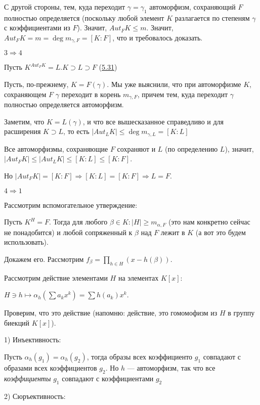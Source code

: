 \documentclass[../main.tex]{subfiles}
\begin{document}
    С другой стороны, тем, куда переходит $\gamma = \gamma_1$ автоморфизм,
    сохраняющий $F$ полностью определяется (поскольку любой элемент $K$
    разлагается по степеням $\gamma$ с коэффициентами из $F$). Значит,
    $Aut_FK \leqslant m$. Значит, $Aut_FK = m = \deg m_{\gamma, F} = [K : F]$,
    что и требовалось доказать.

    $3 \Rightarrow 4$

    Пусть $K^{Aut_FK} = L. K \supset L \supset F$ (\hyperlink{5.31}{5.31})

    Пусть, по-прежнему, $K = F(\gamma)$. Мы уже выяснили, что при автоморфизме
    $K$, сохраняющем $F$ $\gamma$ переходит в корень $m_{\gamma, F}$, причем
    тем, куда переходит $\gamma$ полностью определяется автоморфизм.

    Заметим, что $K = L(\gamma)$, и что все вышесказанное справедливо и для
    расширения $K \supset L$, то есть $|Aut_LK| \leqslant \deg m_{\gamma, L}
    = [K : L]$

    Все автоморфизмы, сохраняющие $F$ сохраняют и $L$ (по определению $L$),
    значит, $|Aut_FK| \leqslant |Aut_LK| \leqslant [K : L] \leqslant [K : F]$.

    Но $|Aut_FK| = [K : F] \Rightarrow [K : L] = [K : F] \Rightarrow L = F$.

    $4 \Rightarrow 1$

    Рассмотрим вспомогательное утверждение:

    Пусть $K^H = F$. Тогда для любого $\beta \in K: |H| \geqslant
    m_{\alpha, F}$ (это нам конкретно сейчас не понадобится)
    и любой сопряженный к $\beta$ над $F$ лежит в $K$
    (а вот это будем использовать).

    Докажем его. Рассмотрим $f_\beta
    = {\displaystyle \prod_{h \in H}(x - h(\beta))}$.

    Рассмотрим действие элементами $H$ на элементах
    $K[x]:$

    $H \ni h \mapsto \alpha_h(\sum a_k x^k) = \sum h(a_k) x^k$.

    Проверим, что это действие
    (напомню: действие, это гомомофизм из $H$ в группу биекций $K[x]$).

    1) Инъективность:

    Пусть $\alpha_h(g_1) = \alpha_h(g_2)$, тогда образы всех
    коэффициенто $g_1$ совпадают с образами всех коэффициентов $g_2$.
    Но $h$ --- автоморфизм, так что все \textit{коэффициенты} $g_1$ совпадают
    с коэффициентами $g_2$

    2) Сюръективность:
\end{document}
